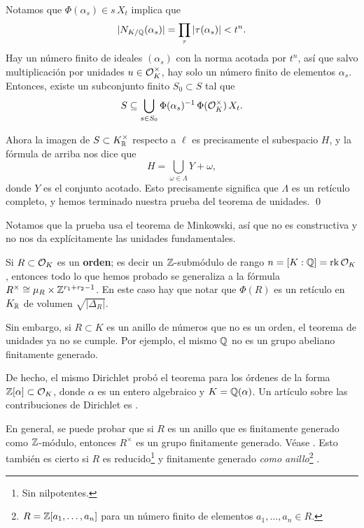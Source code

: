 Notamos que $\Phi (\alpha_s) \in s\,X_t$ implica que
$$|N_{K/\mathbb{Q}} (\alpha_s)| = \prod_\tau |\tau (\alpha_s)| < t^n.$$
Hay un número finito de ideales $(\alpha_s)$ con la norma acotada por $t^n$, así
que salvo multiplicación por unidades $u \in \mathcal{O}_K^\times$, hay solo un número
finito de elementos $\alpha_s$. Entonces, existe un subconjunto finito
$S_0 \subset S$ tal que
$$S \subseteq \bigcup_{s \in S_0} \Phi (\alpha_s)^{-1}\,\Phi (\mathcal{O}_K^\times)\,X_t.$$

Ahora la imagen de $S \subset K_{\mathbb{R}}^\times$ respecto a $\ell$
es precisamente el subespacio $H$, y la fórmula de arriba nos dice que
$$H = \bigcup_{\omega \in \Lambda} Y + \omega,$$
donde $Y$ es el conjunto acotado. Esto precisamente significa que $\Lambda$
es un retículo completo, y hemos terminado nuestra prueba del teorema de
unidades. \qed

\vspace{1em}

Notamos que la prueba usa el teorema de Minkowski, así que no es constructiva
y no nos da explícitamente las unidades fundamentales.

\begin{comentario}
  Si $R \subset \mathcal{O}_K$ es un \textbf{orden}; es decir un $\mathbb{Z}$-submódulo de rango
  $n = [K : \mathbb{Q}] = \operatorname{rk} \mathcal{O}_K$, entonces todo lo que hemos probado se generaliza a
  la fórmula $R^\times \cong \mu_R \times \mathbb{Z}^{r_1 + r_2 - 1}$. En este caso hay
  que notar que $\Phi (R)$ es un retículo en $K_{\mathbb{R}}$ de volumen
  $\sqrt{|\Delta_R|}$.

  Sin embargo, si $R \subset K$ es un anillo de números que no es un orden, el
  teorema de unidades ya no se cumple. Por ejemplo, el mismo $\mathbb{Q}$ no es un
  grupo abeliano finitamente generado.

  De hecho, el mismo Dirichlet probó el teorema para los órdenes de la forma
  $\mathbb{Z} [\alpha] \subset \mathcal{O}_K$, donde $\alpha$ es un entero algebraico y
  $K = \mathbb{Q} (\alpha)$. Un artículo sobre las contribuciones de Dirichlet
  es \cite{Elstrodt-2007}.
\end{comentario}

\begin{comentario}
  En general, se puede probar que si $R$ es un anillo que es finitamente
  generado como $\mathbb{Z}$-módulo, entonces $R^\times$ es un grupo finitamente
  generado. Véase \cite[\S 4.7]{Samuel-TAN}. Esto también es cierto si $R$
  es reducido\footnote{Sin nilpotentes.} y finitamente generado
  \emph{como anillo}\footnote{$R = \mathbb{Z} [a_1,\ldots,a_n]$ para un número finito
    de elementos $a_1,\ldots,a_n \in R$.} \cite{Samuel-1966}.
\end{comentario}

